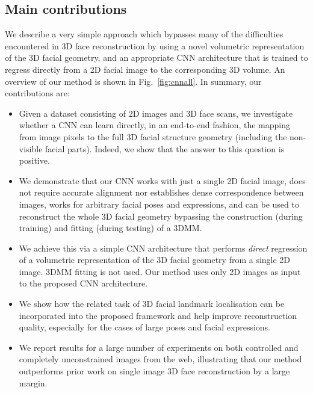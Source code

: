 \subsection{Main contributions}
We describe a very simple approach which bypasses many of the
difficulties encountered in 3D face reconstruction by using a
novel volumetric representation of the 3D facial geometry, and
an appropriate CNN architecture that is trained to regress directly
from a 2D facial image to the corresponding 3D volume. An overview of
our method is shown in Fig.~\ref{fig:cnnall}. In summary, our contributions
are:
\begin{itemize}
\item Given a dataset consisting of 2D images and 3D face scans, we
  investigate whether a CNN can learn directly, in an end-to-end fashion, the
  mapping from image pixels to the full 3D facial structure geometry
  (including the non-visible facial parts). Indeed, we show that the
  answer to this question is positive.
\item We demonstrate that our CNN works with just a single 2D facial
  image, does not require accurate alignment nor establishes dense
  correspondence between images, works for arbitrary facial poses and
  expressions, and can be used to reconstruct the whole 3D facial
  geometry bypassing the construction (during training) and fitting
  (during testing) of a 3DMM.
\item We achieve this via a simple CNN architecture that performs
  \textit{direct} regression of a volumetric representation of the 3D
  facial geometry from a single 2D image. 3DMM fitting is not
  used. Our method uses only 2D images as input to the proposed CNN
  architecture.
\item We show how the related task of 3D facial landmark localisation
  can be incorporated into the proposed framework and help improve
  reconstruction quality, especially for the cases of large poses and
  facial expressions.
\item We report results for a large number of experiments on both
  controlled and completely unconstrained images from the web,
  illustrating that our method outperforms prior work on single image
  3D face reconstruction by a large margin.
\end{itemize}




